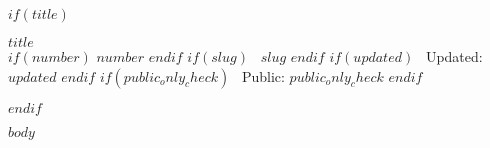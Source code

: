 \documentclass[11pt]{article}
\begin{document}
$if(title)$
\begin{center}
  {\LARGE\bfseries $title$}\\[6pt]
  {\small
    $if(number)$ $number$ $endif$
    $if(slug)$ \textbullet\ $slug$ $endif$
    $if(updated)$ \textbullet\ Updated: $updated$ $endif$
    $if(public_only_check)$ \textbullet\ Public: $public_only_check$ $endif$
  }
\end{center}
\medskip
$endif$


$body$
\end{document}
